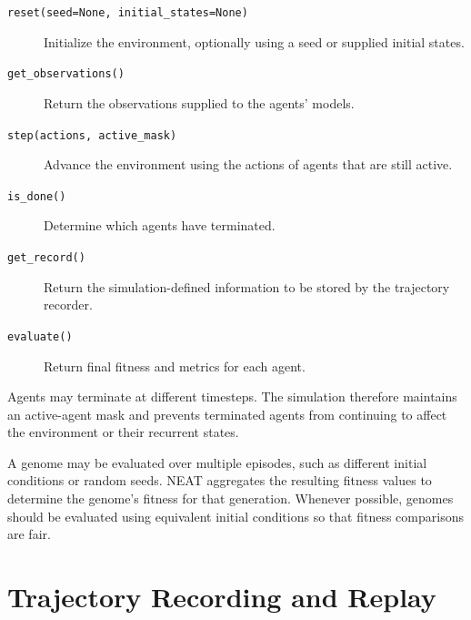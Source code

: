 \documentclass[11pt]{article}
\begin{document}
\begin{description}

    \item[\texttt{reset(seed=None, initial\_states=None)}]
    \hspace{1em}Initialize the environment, optionally using a seed or
    supplied initial states.

    \item[\texttt{get\_observations()}]
    \hspace{1em}Return the observations supplied to the agents' models.

    \item[\texttt{step(actions, active\_mask)}]
    \hspace{1em}Advance the environment using the actions of agents that
    are still active.

    \item[\texttt{is\_done()}]
    \hspace{1em}Determine which agents have terminated.

    \item[\texttt{get\_record()}]
    \hspace{1em}Return the simulation-defined information to be stored
    by the trajectory recorder.

    \item[\texttt{evaluate()}]
    \hspace{1em}Return final fitness and metrics for each agent.

\end{description}

Agents may terminate at different timesteps. The simulation therefore
maintains an active-agent mask and prevents terminated agents from
continuing to affect the environment or their recurrent states.

A genome may be evaluated over multiple episodes, such as different
initial conditions or random seeds. NEAT aggregates the resulting
fitness values to determine the genome's fitness for that generation.
Whenever possible, genomes should be evaluated using equivalent
initial conditions so that fitness comparisons are fair.

\section{Trajectory Recording and Replay}
\end{document}
